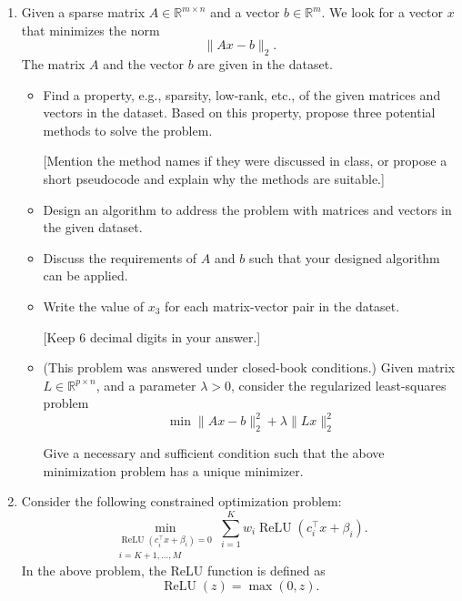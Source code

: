\begin{enumerate}
    \item[一、]
Given a sparse matrix $A\in\mathbb{R}^{m\times n}$ and a vector $b\in\mathbb{R}^m$. We look for a vector $x$ that minimizes the norm
\[
    \|Ax-b\|_2.
\]
The matrix $A$ and the vector $b$ are given in the dataset.

\begin{itemize}
    \item[(1) (10 pt)] Find a property, e.g., sparsity, low-rank, etc., of the given matrices and vectors in the dataset. Based on this property, propose three potential methods to solve the problem.

    [Mention the method names if they were discussed in class, or propose a short pseudocode and explain why the methods are suitable.]

    \item[(2) (15 pt)] Design an algorithm to address the problem with matrices and vectors in the given dataset.

    \item[(3) (5 pt)] Discuss the requirements of $A$ and $b$ such that your designed algorithm can be applied.

    \item[(4) (10 pt)] Write the value of $x_3$ for each matrix-vector pair in the dataset. 
    
    [Keep 6 decimal digits in your answer.]

    \item[(5) (10 pt)] (This problem was answered under closed-book conditions.) 
    Given matrix $L\in\mathbb{R}^{p\times n}$, 
    and a parameter $\lambda>0$, consider the regularized least-squares problem
\[
    \min
        \|Ax-b\|_2^2+\lambda\|Lx\|_2^2
\]

Give a necessary and sufficient condition such that the above minimization problem has a unique minimizer.

\end{itemize}



\item[二、]
Consider the following constrained optimization problem:
\[
    \min_{\substack{\operatorname{ReLU}(c_i^\top x+\beta_i)=0\\
    i=K+1,\ldots,M}}
    \sum_{i=1}^{K} w_i\operatorname{ReLU}(c_i^\top x+\beta_i).
\]
In the above problem, the ReLU function is defined as
\[
    \operatorname{ReLU}(z)=\max(0,z).
\]


\end{enumerate}
